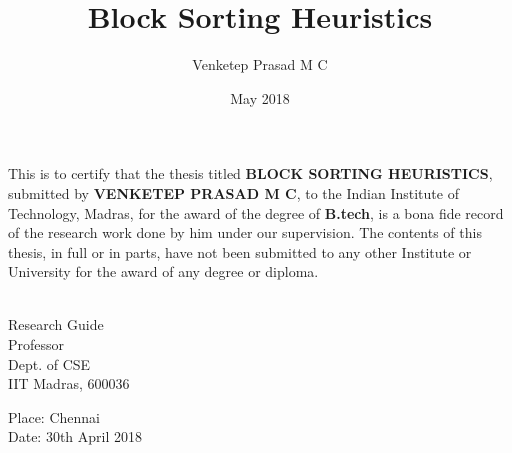 \documentclass[BTech]{iitmdiss}
\begin{document}

\title{Block Sorting Heuristics}

\author{Venketep Prasad M C}

\date{May 2018}

\maketitle

\certificate

\vspace*{0.5in}

\noindent This is to certify that the thesis titled {\bf BLOCK SORTING HEURISTICS}, submitted by {\bf VENKETEP PRASAD M C}, 
  to the Indian Institute of Technology, Madras, for
the award of the degree of {\bf B.tech}, is a bona fide
record of the research work done by him under our supervision.  The
contents of this thesis, in full or in parts, have not been submitted
to any other Institute or University for the award of any degree or
diploma.

\vspace*{1.5in}

\begin{singlespacing}
\hspace*{-0.25in}
\parbox{2.5in}{
 \\
\noindent Research Guide \\ 
\noindent Professor \\
\noindent Dept. of CSE\\
\noindent IIT Madras, 600036 \\
} 
\hspace*{1.0in} 
\end{singlespacing}
\vspace*{0.25in}
\noindent Place: Chennai\\
Date: 30th April 2018 
\end{document}
